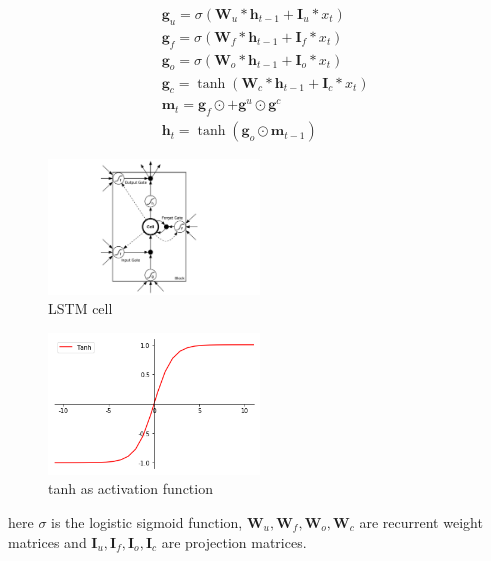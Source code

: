 \documentclass[5p]{elsarticle}
\begin{document}
\begin{equation}
	\begin{split}
		& \mathbf g_u = \sigma(\mathbf W_u * \mathbf h_{t-1} + \mathbf I_u * x_t) \\
		& \mathbf g_f = \sigma(\mathbf W_f * \mathbf h_{t-1} + \mathbf I_f * x_t) \\
		& \mathbf g_o = \sigma(\mathbf W_o * \mathbf h_{t-1} + \mathbf I_o * x_t) \\
		& \mathbf g_c = \tanh(\mathbf W_c * \mathbf h_{t-1} + \mathbf I_c *  x_t) \\
		& \mathbf m_t = \mathbf g_f \odot \mathbf +  \mathbf g^u \odot \mathbf g^c \\
		& \mathbf h_t = \tanh(\mathbf g_o \odot \mathbf m_{t-1}) 
	\end{split}
\end{equation}

\begin{figure}[h]
    \centering
    \includegraphics[width=0.5\textwidth]{lstm_cell.png}
    \caption{LSTM cell}
    \label{fig:LSTMCELL}
\end{figure}

\begin{figure}[h]
    \centering
    \includegraphics[width=0.5\textwidth]{tanh.png}
    \caption{tanh as activation function}
    \label{fig:tanh}
\end{figure}

here $\sigma$ is the logistic sigmoid function, $\mathbf W_u, \mathbf W_f, \mathbf W_o, \mathbf W_c$ are recurrent weight matrices and $\mathbf I_u, \mathbf I_f, \mathbf I_o, \mathbf I_c$ are projection matrices.
\end{document}
